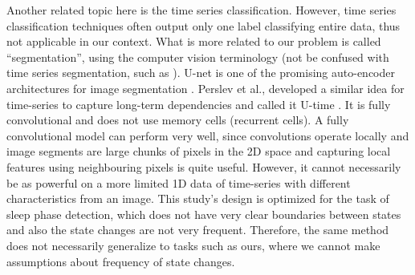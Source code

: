 Another related topic here is the time series classification. However, time series classification techniques often output only one label classifying entire data, thus not applicable in our context. What is more related to our problem is called ``segmentation'', using the computer vision terminology (not be confused with time series segmentation, such as \cite{lemire2007better}). U-net is one of the promising auto-encoder architectures for image segmentation \cite{ronneberger2015u}. Perslev et al., developed a similar idea for time-series to capture long-term dependencies and called it U-time \cite{perslev2019u}. It is fully convolutional and does not use memory cells (recurrent cells). A fully convolutional model can perform very well, since convolutions operate locally and image segments are large chunks of pixels in the 2D space and capturing local features using neighbouring pixels is quite useful. However, it cannot necessarily be as powerful on a more limited 1D data of time-series with different characteristics from an image.  This study's design is optimized for the task of sleep phase detection, which does not have very clear boundaries between states and also the state changes are not very frequent. Therefore, the same method does not necessarily generalize to tasks such as ours, where we cannot make assumptions about frequency of state changes.


